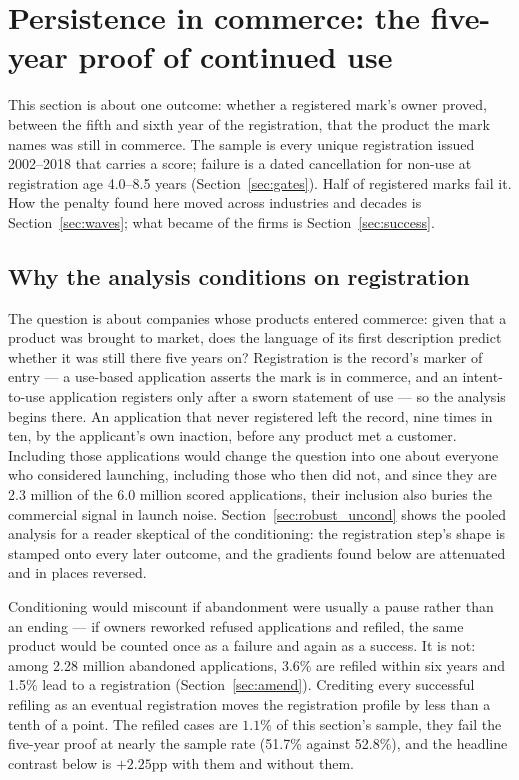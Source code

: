 \section{Persistence in commerce: the five-year proof of continued use}\label{sec:gate}

This section is about one outcome: whether a registered mark's owner
proved, between the fifth and sixth year of the registration, that the
product the mark names was still in commerce. The sample is every unique
registration issued 2002--2018 that carries a score; failure is a dated
cancellation for non-use at registration age 4.0--8.5 years
(Section~\ref{sec:gates}). Half of registered marks fail it. How the
penalty found here moved across industries and decades is
Section~\ref{sec:waves}; what became of the firms is
Section~\ref{sec:success}.

\subsection{Why the analysis conditions on registration}\label{sec:filter}

The question is about companies whose products entered commerce: given
that a product was brought to market, does the language of its first
description predict whether it was still there five years on? Registration
is the record's marker of entry --- a use-based application asserts the
mark is in commerce, and an intent-to-use application registers only after
a sworn statement of use --- so the analysis begins there. An application
that never registered left the record, nine times in ten, by the
applicant's own inaction, before any product met a customer. Including
those applications would change the question into one about everyone who
considered launching, including those who then did not, and since they are
2.3 million of the 6.0 million scored applications, their inclusion also
buries the commercial signal in launch noise.
Section~\ref{sec:robust_uncond} shows the pooled analysis for a reader
skeptical of the conditioning: the registration step's shape is stamped
onto every later outcome, and the gradients found below are attenuated and
in places reversed.

Conditioning would miscount if abandonment were usually a pause rather
than an ending --- if owners reworked refused applications and refiled,
the same product would be counted once as a failure and again as a
success. It is not: among 2.28 million abandoned applications, 3.6\% are
refiled within six years and 1.5\% lead to a registration
(Section~\ref{sec:amend}). Crediting every successful refiling as an
eventual registration moves the registration profile by less than a tenth
of a point. The refiled cases are $1.1$\% of this section's sample, they
fail the five-year proof at nearly the sample rate (51.7\% against
52.8\%), and the headline contrast below is $+2.25$pp with them and
without them.

